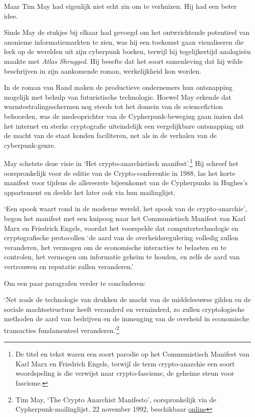\documentclass[
  a5paper,
  smalldemyvopaper,11pt,twoside,onecolumn,openright,extrafontsizes]{memoir}
\begin{document}
Maar Tim May had eigenlijk niet echt zin om te verhuizen. Hij had een
beter idee.

Sinds May de stukjes bij elkaar had gevoegd om het ontwrichtende
potentieel van anonieme informatiemarkten te zien, was hij een toekomst
gaan visualiseren die leek op de werelden uit zijn cyberpunk boeken,
terwijl hij tegelijkertijd analogieën maakte met \emph{Atlas Shrugged}.
Hij besefte dat het soort samenleving dat hij wilde beschrijven in zijn
aankomende roman, werkelijkheid kon worden.

In de roman van Rand maken de productieve ondernemers hun ontsnapping
mogelijk met behulp van futuristische technologie. Hoewel May erkende
dat warmtestralingsschermen nog steeds tot het domein van de
sciencefiction behoorden, was de medeoprichter van de
Cypherpunk-beweging gaan inzien dat het internet en sterke cryptografie
uiteindelijk een vergelijkbare ontsnapping uit de macht van de staat
konden faciliteren, net als in de verhalen van de cyberpunk-genre.

May schetste deze visie in `Het crypto-anarchistisch
manifest'.\footnote{De titel en tekst waren een soort parodie op het
  Communistisch Manifest van Karl Marx en Friedrich Engels, terwijl de
  term crypto-anarchie een soort woordspeling is die verwijst naar
  crypto-fascisme, de geheime steun voor fascisme.} Hij schreef het
oorspronkelijk voor de editie van de Crypto-conferentie in 1988, las het
korte manifest voor tijdens de allereerste bijeenkomst van de
Cypherpunks in Hughes's appartement en deelde het later ook via hun
mailinglijst.

`Een spook waart rond in de moderne wereld, het spook van de
crypto-anarchie', begon het manifest met een knipoog naar het
Communistisch Manifest van Karl Marx en Friedrich Engels, voordat het
voorspelde dat computertechnologie en cryptografische protocollen `de
aard van de overheidsregulering volledig zullen veranderen, het vermogen
om de economische interacties te belasten en te controlen, het vermogen
om informatie geheim te houden, en zelfs de aard van vertrouwen en
reputatie zullen veranderen.'

Om een paar paragrafen verder te concluderen:

`Net zoals de technologie van drukken de macht van de middeleeuwse
gilden en de sociale machtsstructuur heeft veranderd en verminderd, zo
zullen cryptologische methoden de aard van bedrijven en de inmenging van
de overheid in economische transacties fundamenteel
veranderen.'\footnote{Tim May, `The Crypto Anarchist Manifesto',
  oorspronkelijk via de Cypherpunk-mailinglijst, 22 november 1992,
  beschikbaar
  \href{https://cypherpunks.venona.com/date/1992/11/msg00204.html}{online}}
\end{document}
